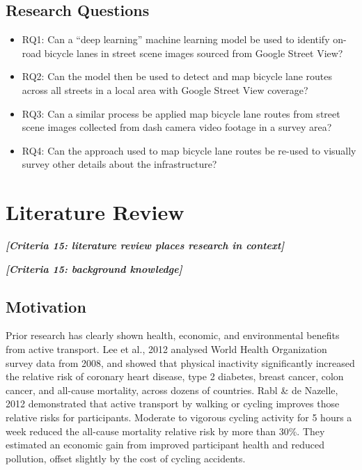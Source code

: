 \documentclass[11pt,twoside]{report}
\newcommand{\remark}[1]{{\bf \em [\marginpar{$\Leftarrow$}#1]}}
\begin{document}
\section{Research Questions}
\begin{itemize}
\item{RQ1: Can a ``deep learning'' machine learning model be used to identify on-road bicycle lanes in street scene images sourced from Google Street View?}
\item{RQ2: Can the model then be used to detect and map bicycle lane routes across all streets in a local area with Google Street View coverage?}
\item{RQ3: Can a similar process be applied map bicycle lane routes from street scene images collected from dash camera video footage in a survey area?}
\item{RQ4: Can the approach used to map bicycle lane routes be re-used to visually survey other details about the infrastructure?}
\end{itemize}


\chapter{Literature Review}

\remark{Criteria 15: literature review places research in context}

\remark{Criteria 15: background knowledge}

\section{Motivation}

Prior research has clearly shown health, economic, and environmental benefits from active transport.  Lee et al., 2012 \cite{LEE2012219} analysed World Health Organization survey data from 2008, and showed that physical inactivity significantly increased the relative risk of coronary heart disease, type 2 diabetes, breast cancer, colon cancer, and all-cause mortality, across dozens of countries.  Rabl \& de Nazelle, 2012 \cite{RABL2012121} demonstrated that active transport by walking or cycling improves those relative risks for participants.  Moderate to vigorous cycling activity for 5 hours a week reduced the all-cause mortality relative risk by more than 30\%.  They estimated an economic gain from improved participant health and reduced pollution, offset slightly by the cost of cycling accidents.
\end{document}
